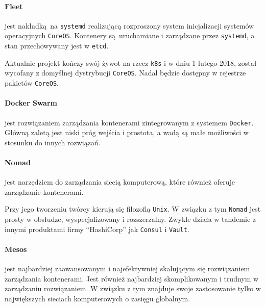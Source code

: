 \documentclass[a4paper,12pt,twoside,openany]{report}
\newcommand{\passthrough}[1]{#1}
\begin{document}
\hypertarget{fleet}{%
\paragraph{Fleet}\label{fleet}}

jest nakładką~na \passthrough{\lstinline!systemd!} realizującą
rozproszony system inicjalizacji systemów operacyjnych
\passthrough{\lstinline!CoreOS!}. Kontenery są~uruchamiane i zarządzane
przez \passthrough{\lstinline!systemd!}, a stan przechowywany jest w
\passthrough{\lstinline!etcd!}.

Aktualnie projekt kończy swój żywot na rzecz
\passthrough{\lstinline!k8s!} i w dniu 1 lutego 2018, został wycofany z
domyślnej dystrybucji \passthrough{\lstinline!CoreOS!}. Nadal będzie
dostępny w rejestrze pakietów \passthrough{\lstinline!CoreOS!}.

\hypertarget{docker-swarm}{%
\paragraph{Docker Swarm}\label{docker-swarm}}

jest rozwiązaniem zarządzania kontenerami zintegrowanym z systemem
\passthrough{\lstinline!Docker!}. Główną zaletą jest niski próg wejścia
i prostota, a wadą są małe możliwości w stosunku do innych rozwiązań.

\hypertarget{nomad}{%
\paragraph{Nomad}\label{nomad}}

jest narzędziem do zarządzania siecią komputerową, które również oferuje
zarządzanie kontenerami.

Przy jego tworzeniu twórcy kierują się filozofią
\passthrough{\lstinline!Unix!}. W związku z tym
\passthrough{\lstinline!Nomad!} jest prosty w obsłudze, wyspecjalizowany
i rozszerzalny. Zwykle działa w tandemie z innymi produktami firmy
``HashiCorp'' jak \passthrough{\lstinline!Consul!} i
\passthrough{\lstinline!Vault!}.

\hypertarget{mesos}{%
\paragraph{Mesos}\label{mesos}}

jest najbardziej zaawansowanym i najefektywniej skalującym się
rozwiązaniem zarządzania kontenerami. Jest również najbardziej
skomplikowanym i trudnym w zarządzaniu rozwiązaniem. W związku z tym
znajduje swoje zastosowanie tylko w największych sieciach komputerowych
o zasięgu globalnym.
\end{document}
